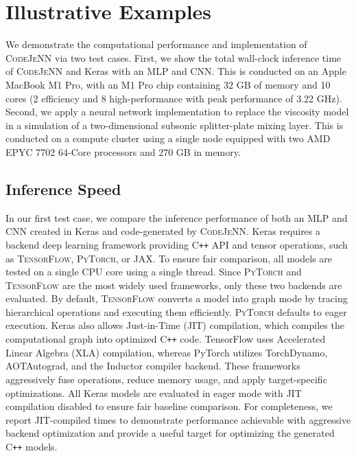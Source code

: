 \documentclass[preprint,12pt, a4paper]{elsarticle}
\begin{document}
\section{Illustrative Examples}
We demonstrate the computational performance and implementation of \textsc{CodeJeNN} via two test cases. First, we show the total wall-clock inference time of \textsc{CodeJeNN} and Keras with an MLP and CNN. This is conducted on an Apple MacBook M1 Pro, with an M1 Pro chip containing 32 GB of memory and 10 cores (2 efficiency and 8 high-performance with peak performance of 3.22 GHz). Second, we apply a neural network implementation to replace the viscosity model in a simulation of a two-dimensional subsonic splitter-plate mixing layer. This is conducted on a compute cluster using a single node equipped with two AMD EPYC 7702 64-Core processors and 270 GB in memory.




\subsection{Inference Speed}
In our first test case, we compare the inference performance of both an MLP and CNN created in Keras and code-generated by \textsc{CodeJeNN}. Keras requires a backend deep learning framework providing C\texttt{++} API and tensor operations, such as \textsc{TensorFlow}, \textsc{PyTorch}, or \textsc{JAX}. To ensure fair comparison, all models are tested on a single CPU core using a single thread. Since \textsc{PyTorch} and \textsc{TensorFlow} are the most widely used frameworks, only these two backends are evaluated. By default, \textsc{TensorFlow} converts a model into graph mode by tracing hierarchical operations and executing them efficiently. \textsc{PyTorch} defaults to eager execution. Keras also allows Just-in-Time (JIT) compilation, which compiles the computational graph into optimized C\texttt{++} code. TensorFlow uses Accelerated Linear Algebra (XLA) compilation, whereas PyTorch utilizes TorchDynamo, AOTAutograd, and the Inductor compiler backend. These frameworks aggressively fuse operations, reduce memory usage, and apply target-specific optimizations. All Keras models are evaluated in eager mode with JIT compilation disabled to ensure fair baseline comparison. For completeness, we report JIT-compiled times to demonstrate performance achievable with aggressive backend optimization and provide a useful target for optimizing the generated C\texttt{++} models.
\end{document}
